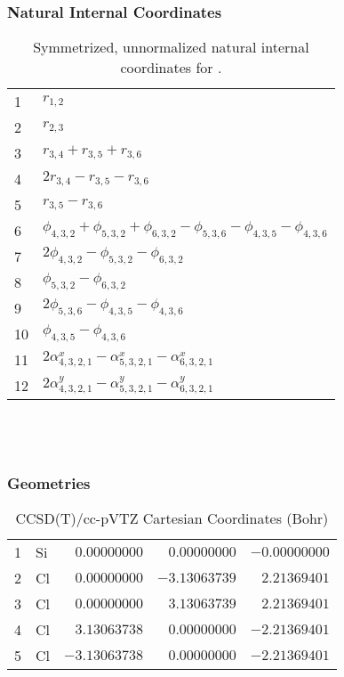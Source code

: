 \documentclass[10pt,oneside]{article}
\begin{document}
\subsubsection*{Natural Internal Coordinates}
\begin{table}[h!]
\centering
\caption{Symmetrized, unnormalized natural internal coordinates for .}
\small
\begin{tabular}{ll}
  1   & $r_{1,2}$ \\
  2   & $r_{2,3}$ \\
  3   & $r_{3,4} + r_{3,5} + r_{3,6}$ \\
  4   & $2r_{3,4} - r_{3,5} - r_{3,6}$ \\
  5   & $r_{3,5} - r_{3,6}$ \\
  6   & $\phi_{4,3,2} + \phi_{5,3,2} + \phi_{6,3,2} - \phi_{5,3,6} - \phi_{4,3,5} - \phi_{4,3,6}$ \\
  7   & $2\phi_{4,3,2} - \phi_{5,3,2} - \phi_{6,3,2}$ \\
  8   & $\phi_{5,3,2} - \phi_{6,3,2}$ \\
  9   & $2\phi_{5,3,6} - \phi_{4,3,5} - \phi_{4,3,6}$ \\
  10  & $\phi_{4,3,5} - \phi_{4,3,6}$ \\
  11  & $2\alpha^x_{4,3,2,1} - \alpha^x_{5,3,2,1} - \alpha^x_{6,3,2,1}$ \\
  12  & $2\alpha^y_{4,3,2,1} - \alpha^y_{5,3,2,1} - \alpha^y_{6,3,2,1}$ \\
\end{tabular}
\end{table}

\clearpage

\subsection{\ \ \ }

\subsubsection*{Geometries}
\begin{table}[h!]
\centering
\caption{CCSD(T)/cc-pVTZ Cartesian Coordinates (Bohr)}
\begin{tabular}{llrrr}
1  & Si & $ 0.00000000$ & $ 0.00000000$ & $-0.00000000$ \\
2  & Cl & $ 0.00000000$ & $-3.13063739$ & $ 2.21369401$ \\
3  & Cl & $ 0.00000000$ & $ 3.13063739$ & $ 2.21369401$ \\
4  & Cl & $ 3.13063738$ & $ 0.00000000$ & $-2.21369401$ \\
5  & Cl & $-3.13063738$ & $ 0.00000000$ & $-2.21369401$ \\
\end{tabular}
\end{table}
\end{document}
